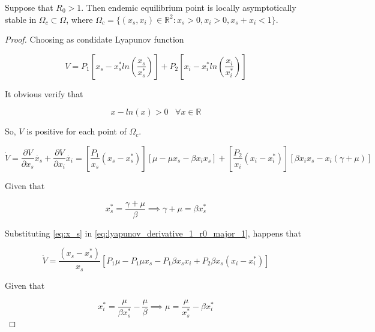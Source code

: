 \begin{theorem}
Suppose that $R_0 > 1$. Then endemic equilibrium point is locally asymptotically stable in $\Omega_c \subset \Omega$, where $\Omega_c = \{\left(x_s,x_i\right) \in \mathbb{R}^2 : x_s > 0, x_i > 0, x_s + x_i < 1\}$.
\end{theorem}

\begin{proof}
Choosing as condidate Lyapunov function

\begin{equation}
    \label{eq:lyapunov_r0_major_1}
    V = P_1 \left[ x_s - x_s^*ln\left( \frac{x_s}{x_s^*} \right)\right] + P_2 \left[ x_i - x_i^*ln\left( \frac{x_i}{x_i^*} \right)\right]
\end{equation}

It obvious verify that

\begin{equation}
    x - ln(x) > 0 \;\;\; \forall x \in \mathbb{R}
\end{equation}

So, $V$ is positive for each point of $\Omega_c$.

\begin{equation}
    \label{eq:lyapunov_derivative_1_r0_major_1}
    \dot{V} = \frac{\partial V}{\partial x_s} \dot{x_s} + \frac{\partial V}{\partial x_i} \dot{x_i} = \left[ \frac{P_1}{x_s}(x_s - x_s^*) \right] \left[ \mu - \mu x_s - \beta x_i x_s \right] + \left[ \frac{P_2}{x_i}(x_i - x_i^*) \right] \left[ \beta x_i x_s - x_i (\gamma + \mu) \right]
\end{equation}

Given that

\begin{equation}
    \label{eq:x_s}
    x_s^* = \frac{\gamma + \mu}{\beta} \implies \gamma + \mu = \beta x_s^*
\end{equation}

Substituting \ref{eq:x_s} in \ref{eq:lyapunov_derivative_1_r0_major_1}, happens that

\begin{equation}
    \label{eq:lyapunov_derivative_2_r0_major_1}
    \dot{V} =  \frac{\left(x_s - x_s^*\right)}{x_s} \left[  P_1 \mu - P_1 \mu x_s - P_1\beta x_sx_i+P_2 \beta x_s \left( x_i - x_i^* \right) \right]
\end{equation}

Given that

\begin{equation}
    \label{eq:x_i}
    x_i^* = \frac{\mu}{\beta x_s^*} - \frac{\mu}{\beta} \implies \mu = \frac{\mu}{x_s^*} - \beta x_i^*
\end{equation}


\end{proof}
